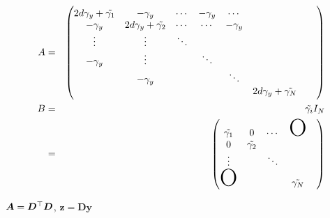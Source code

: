 \documentclass[platex, a4paper]{jsarticle}
\begin{document}
\begin{eqnarray}
  A &=& \begin{pmatrix}
  2d\gamma_y + \tilde{\gamma_1} & -\gamma_y   & \cdots & -\gamma_y   & \cdots &\\
  -\gamma_y & 2d\gamma_y + \tilde{\gamma_2} &\cdots &  \cdots &  -\gamma_y  &  \\
  \vdots&\vdots& \ddots &&& \\
  -\gamma_y &\vdots&& \ddots &&& \\
  &-\gamma_y&&& \ddots &&& \\
  &&&&& 2d\gamma_y + \tilde{\gamma_N} \\
  \end{pmatrix} \\
  B &=& \tilde {\gamma_i} I_{N} \\
    &=& \begin{pmatrix}
      \tilde{\gamma_1} & 0 & \cdots & \mbox{\Huge O}\\
      0 & \tilde{\gamma_2} & && \\
      \vdots & & \ddots \\
      \mbox{\Huge O}&&& \tilde{\gamma_N}
  \end{pmatrix}
\end{eqnarray}

$\bm{A}=\bm{D}^{\top} \bm{D}$, $\bm{z}=\bm{D}\bm{y}$
\end{document}
